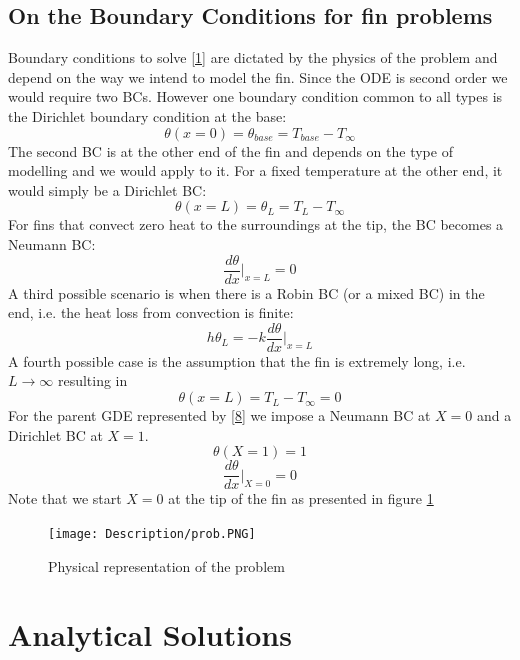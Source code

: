 \documentclass[12pt]{article}
\begin{document}
\subsection{On the Boundary Conditions for fin problems}
Boundary conditions to solve \eqref{1} are dictated by the physics of the problem and depend on the way we intend to model the fin. Since the ODE is second order we would require two BCs. However one boundary condition common to all types is the Dirichlet boundary condition at the base:
\[
\theta(x=0) = \theta_{base} = T_{base} - T_\infty \tag{10} \label{10}
\]
The second BC is at the other end of the fin and depends on the type of modelling and we would apply to it. For a fixed temperature at the other end, it would simply be a Dirichlet BC:
\[
\theta (x= L) = \theta_L = T_{L} - T_\infty \tag{11} \label{11}
\]
For fins that convect zero heat to the surroundings at the tip, the BC becomes a Neumann BC: 
\[
\frac{d\theta}{dx}\Bigr|_{x=L} = 0 \tag{12} \label{12}
\]
A third possible scenario is when there is a Robin BC (or a mixed BC) in the end, i.e. the heat loss from convection is finite: 
\[
h\theta_L = -k\frac{d\theta}{dx}\Bigr|_{x=L} \tag{13} \label{13}
\]
A fourth possible case is the assumption that the fin is extremely long, i.e. $L\to\infty$ resulting in \[
\theta (x=L) = T_L-T_\infty = 0 \tag{14} \label{14}  
\]
For the parent GDE represented by \eqref{8} we impose a Neumann BC at $X=0$ and a Dirichlet BC at $X=1$.
\[
\theta (X=1) = 1 \tag{15} \label{15}
\]
\[
\frac{d\theta}{dx}\Bigr|_{X=0} = 0 \tag{16} \label{16}
\]
Note that we start $X=0$ at the tip of the fin as presented in figure \ref{fig:1}
\begin{figure}
    \centering
    \texttt{[image: Description/prob.PNG]}
    \caption{Physical representation of the problem}
    \label{fig:1}
\end{figure}
\section{Analytical Solutions}\label{sec:analytical}
\end{document}
